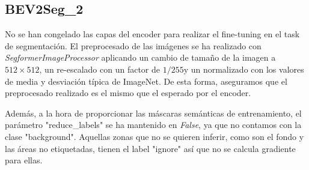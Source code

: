 


\subsection{BEV2Seg\_2}
No se han congelado las capas del encoder para realizar el fine-tuning en el task de segmentación. El preprocesado de las imágenes se ha realizado con \textit{SegformerImageProcessor} aplicando un cambio de tamaño de la imagen a $512 \times 512$, un re-escalado con un factor de $1/255$y un normalizado con los valores de media y desviación típica de ImageNet. De esta forma, aseguramos que el preprocesado realizado es el mismo que el esperado por el encoder.

Además, a la hora de proporcionar las máscaras semánticas de entrenamiento, el parámetro "reduce\_labels" se ha mantenido en \textit{False}, ya que no contamos con la clase "background". Aquellas zonas que no se quieren inferir, como son el fondo y las áreas no etiquetadas, tienen el label "ignore" así que no se calcula gradiente para ellas.

